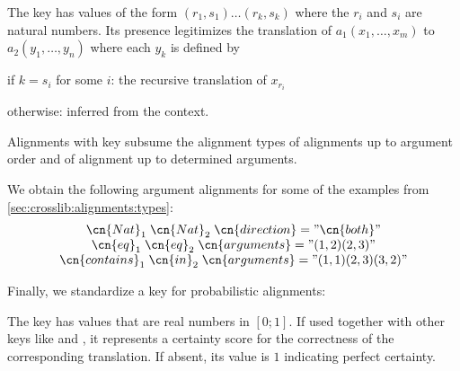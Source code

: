 \begin{definition}\label{def:crosslib:alignments:arguments}
The key  has values of the form $(r_1,s_1)\ldots(r_k,s_k)$ where the $r_i$ and $s_i$ are natural numbers.
Its presence legitimizes the translation of $a_1(x_1,\ldots,x_m)$ to $a_2(y_1,\ldots,y_n)$ where each $y_k$ is defined by
\begin{compactitem}
 \item if $k=s_i$ for some $i$: the recursive translation of $x_{r_i}$ 
 \item otherwise: inferred from the context.
\end{compactitem}
\end{definition}
Alignments with  key subsume the alignment types of alignments up to argument order and of alignment up to determined arguments.

\begin{example}
We obtain the following argument alignments for some of the examples from \autoref{sec:crosslib:alignments:types}:
\[\begin{array}{c}
    \cn{Nat}_1 \; \cn{Nat}_2 \; \cn{direction}="\cn{both}"\\
    \cn{eq}_1 \; \cn{eq}_2 \; \cn{arguments}="(1,2)(2,3)"\\
    \cn{contains}_1 \; \cn{in}_2 \; \cn{arguments}="(1,1)(2,3)(3,2)"
  \end{array}
  \]
\end{example}


Finally, we standardize a key for probabilistic alignments:
\begin{definition}
The key  has values that are real numbers in $[0;1]$.
If used together with other keys like  and , it represents a certainty score for the correctness of the corresponding translation.
If absent, its value is $1$ indicating perfect certainty.
\end{definition}


